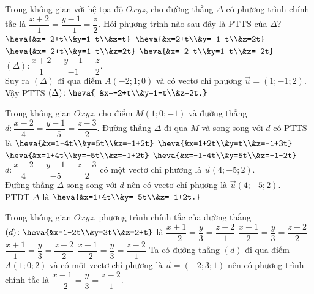 \begin{ex}%
	Trong không gian với hệ tọa độ $O x y z$, cho đường thẳng $\Delta$ có phương trình chính tắc là $\dfrac{x+2}{1}=\dfrac{y-1}{-1}=\dfrac{z}{2}$. Hỏi phương trình nào sau đây là PTTS của $\Delta$?
	\choice 
	{$\heva{&x=-2+t\\&y=1-t\\&z=t}$}
		{$\heva{&x=2+t\\&y=-1-t\\&z=2t}$}
			{\True $\heva{&x=-2+t\\&y=1-t\\&z=2t}$}
				{$\heva{&x=-2-t\\&y=1-t\\&z=-2t}$}
					\loigiai 
					{
$(\Delta)\colon \dfrac{x+2}{1}=\dfrac{y-1}{-1}=\dfrac{z}{2}$.\\
Suy ra $(\Delta)$ đi qua điểm $A(-2;1;0)$ và có vectơ chỉ phương $\vec{u}=(1;-1;2)$.\\
Vậy PTTS $(\Delta)\colon \heva{ &x=-2+t\\&y=1-t\\&z=2t.}$
					}
\end{ex}

\begin{ex}%
	Trong không gian $O x y z$, cho điểm $M(1;0;-1)$ và đường thẳng $d\colon\dfrac{x-2}{4}=\dfrac{y-1}{-5}=\dfrac{z-3}{2}$. Đường thẳng $\Delta$ đi qua $M$ và song song với $d$ có PTTS là 
	\choice 
	{$\heva{&x=1-4t\\&y=5t\\&z=-1+2t}$}
		{$\heva{&x=1+2t\\&y=t\\&z=-1+3t}$}
			{\True $\heva{&x=1+4t\\&y=-5t\\&z=-1+2t}$}
				{$\heva{&x=-1-4t\\&y=5t\\&z=-1-2t}$}
					\loigiai 
					{
$d\colon\dfrac{x-2}{4}=\dfrac{y-1}{-5}=\dfrac{z-3}{2}$ có một vectơ chỉ phương là $\vec{u}(4;-5;2)$.\\
Đường thẳng $\Delta$ song song với $d$ nên có vectơ chỉ phương là $\vec{u}(4;-5;2)$.\\
PTĐT $\Delta$ là $\heva{&x=1+4t\\&y=-5t\\&z=-1+2t.}$
					}
				\end{ex}
			
\begin{ex}%
	Trong không gian $O x y z$, phương trình chính tắc của đường thẳng $(d)\colon\heva{&x=1-2t\\&y=3t\\&z=2+t}$ là 
		\choice 
		{$\dfrac{x+1}{-2}=\dfrac{y}{3}=\dfrac{z+2}{1}$}
		{$\dfrac{x-1}{2}=\dfrac{y}{3}=\dfrac{z+2}{2}$}
		{$\dfrac{x+1}{1}=\dfrac{y}{3}=\dfrac{z-2}{2}$}
		{\True $\dfrac{x-1}{-2}=\dfrac{y}{3}=\dfrac{z-2}{1}$}
		\loigiai 
		{
	Ta có đường thẳng $(d)$ đi qua điểm $A(1;0;2)$ và có một vectơ chỉ phương là $\vec{u}=(-2;3;1)$ nên có phương trình chính tắc là $\dfrac{x-1}{-2}=\dfrac{y}{3}=\dfrac{z-2}{1}$.
		}
	\end{ex}

